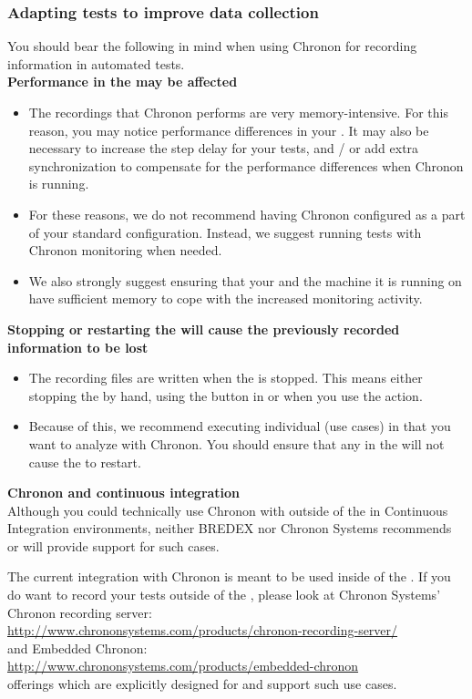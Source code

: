 \subsubsection{Adapting tests to improve data collection}
You should bear the following in mind when using Chronon for recording information in automated tests.\\

\textbf{Performance in the \gdaut{} may be affected}
\begin{itemize}
\item The recordings that Chronon performs are very memory-intensive. For this reason, you may notice performance differences in your \gdaut{}. It may also be necessary to increase the step delay for your tests, and / or add extra synchronization to compensate for the performance differences when Chronon is running. 
\item For these reasons, we do not recommend having Chronon configured as a part of your standard \gdaut{} configuration. Instead, we suggest running tests with Chronon monitoring when needed. 
\item We also strongly suggest ensuring that your \gdaut{} and the machine it is running on have sufficient memory to cope with the increased monitoring activity.
\end{itemize}

\textbf{Stopping or restarting the \gdaut{} will cause the previously recorded information to be lost}
\begin{itemize}
\item The recording files are written when the \gdaut{} is stopped. This means either stopping the \gdaut{} by hand, using the  button in \app{} or when you use the  action. 
\item Because of this, we recommend executing individual \gdcases{} (use cases) in \gdsuites{} that you want to analyze with Chronon. You should ensure that any \gdehandlers{} in the \gdsuite{} will not cause the \gdaut{} to restart.
\end{itemize}

\textbf{Chronon and continuous integration}\\

Although you could technically use Chronon with \app{} outside of the \ite{} in Continuous Integration environments, neither BREDEX nor Chronon Systems recommends or will provide support for such cases.

The current integration with Chronon is meant to be used inside of the \ite{}. If you do want to record your tests outside of the \ite{}, please look at Chronon Systems' Chronon recording server:\\
 \href{http://www.chrononsystems.com/products/chronon-recording-server/}{http://www.chrononsystems.com/products/chronon-recording-server/}\\
and Embedded Chronon:\\
\href{http://www.chrononsystems.com/products/embedded-chronon}{http://www.chrononsystems.com/products/embedded-chronon} \\
 offerings which are explicitly designed for and support such use cases.




